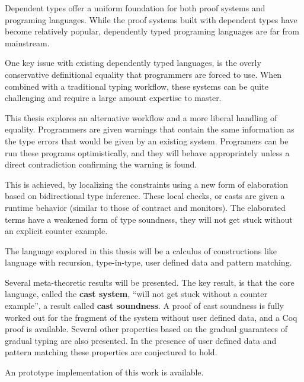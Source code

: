 Dependent types offer a uniform foundation for both proof systems
and programing languages. While the proof systems built with dependent
types have become relatively popular, dependently typed programing
languages are far from mainstream. 

One key issue with existing dependently typed languages, is the overly
conservative definitional equality that programmers are forced to
use. When combined with a traditional typing workflow, these systems
can be quite challenging and require a large amount expertise to master.

This thesis explores an alternative workflow and a more liberal handling
of equality. Programmers are given warnings that contain the same
information as the type errors that would be given by an existing
system. Programers can be run these programs optimistically, and they
will behave appropriately unless a direct contradiction confirming
the warning is found.

This is achieved, by localizing the constraints using a new form of
elaboration based on bidirectional type inference. These local checks,
or casts are given a runtime behavior (similar to those of contract
and monitors). The elaborated terms have a weakened form of type soundness,
they will not get stuck without an explicit counter example.

The language explored in this thesis will be a calculus of constructions
like language with recursion, type-in-type, user defined data and
pattern matching. 

Several meta-theoretic results will be presented. The key result,
is that the core language, called the \textbf{cast system}, ``will
not get stuck without a counter example'', a result called \textbf{cast
soundness}. A proof of cast soundness is fully worked out for the
fragment of the system without user defined data, and a Coq proof
is available. Several other properties based on the gradual guarantees
of gradual typing are also presented. In the presence of user defined
data and pattern matching these properties are conjectured to hold.

An prototype implementation of this work is available.


